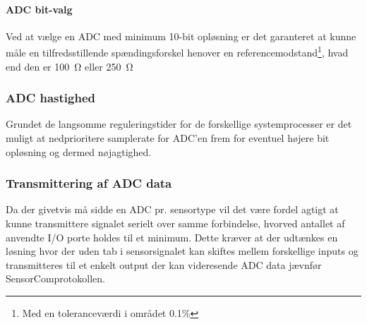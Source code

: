 \paragraph{ADC bit-valg}

Ved at vælge en ADC med minimum 10-bit opløsning er det garanteret at kunne måle en tilfredsstillende spændingsforskel henover en referencemodstand\footnote{Med en toleranceværdi i området 0.1\%}, hvad end den er \SI{100}{\ohm} eller \SI{250}{\ohm}


\subsubsection{ADC hastighed}
Grundet de langsomme reguleringstider for de forskellige systemprocesser er det muligt at nedprioritere samplerate for ADC'en frem for eventuel højere bit opløsning og dermed nøjagtighed.


\subsubsection{Transmittering af ADC data}
Da der givetvis må sidde en ADC pr. sensortype vil det være fordel agtigt at kunne transmittere signalet serielt over samme forbindelse, hvorved antallet af anvendte I/O porte holdes til et minimum.
Dette kræver at der udtænkes en løsning hvor der uden tab i sensorsignalet kan skiftes mellem forskellige inputs og transmitteres til et enkelt output der kan videresende ADC data jævnfør SensorComprotokollen.


